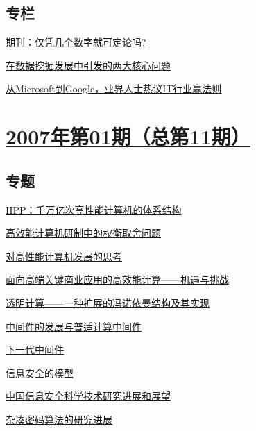 \documentclass[a4paper]{article}
\begin{document}
\subsection{专栏}
\href{http://history.ccf.org.cn/resources/1190201776262/2010/04/15/012080.pdf}{期刊：仅凭几个数字就可定论吗?}

\href{http://history.ccf.org.cn/resources/1190201776262/2010/04/15/012074.pdf}{在数据挖掘发展中引发的两大核心问题}

\href{http://history.ccf.org.cn/resources/1190201776262/2010/04/15/012086.pdf}{从Microsoft到Google，业界人士热议IT行业赢法则}


\section{\href{http://history.ccf.org.cn/sites/ccf/jsjtbbd.jsp?contentId=2542567628950}{\textbf{2007年第01期（总第11期）}}}

\subsection{专题}
\href{http://history.ccf.org.cn/resources/1190201776262/2010/04/15/011064.pdf}{HPP：千万亿次高性能计算机的体系结构}

\href{http://history.ccf.org.cn/resources/1190201776262/2010/04/15/011065.pdf}{高效能计算机研制中的权衡取舍问题}

\href{http://history.ccf.org.cn/resources/1190201776262/2010/04/15/011066.pdf}{对高性能计算机发展的思考}

\href{http://history.ccf.org.cn/resources/1190201776262/2010/04/15/011067.pdf}{面向高端关键商业应用的高效能计算——机遇与挑战}

\href{http://history.ccf.org.cn/resources/1190201776262/2010/04/15/011068.pdf}{透明计算——一种扩展的冯诺依曼结构及其实现}

\href{http://history.ccf.org.cn/resources/1190201776262/2010/04/15/011069.pdf}{中间件的发展与普适计算中间件}

\href{http://history.ccf.org.cn/resources/1190201776262/2010/04/15/011070.pdf}{下一代中间件}

\href{http://history.ccf.org.cn/resources/1190201776262/2010/04/15/011071.pdf}{信息安全的模型}

\href{http://history.ccf.org.cn/resources/1190201776262/2010/04/15/011072.pdf}{中国信息安全科学技术研究进展和展望}

\href{http://history.ccf.org.cn/resources/1190201776262/2010/04/15/011073.pdf}{杂凑密码算法的研究进展}
\end{document}
